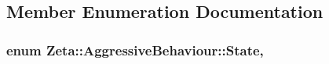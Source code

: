 \subsection{Member Enumeration Documentation}
\hypertarget{classZeta_1_1AggressiveBehaviour_a768e2c9d0969879f4980d72220e11fbe}{
\subsubsection[{State}]{\setlength{\rightskip}{0pt plus 5cm}enum {\bf Zeta\+::\+Aggressive\+Behaviour\+::\+State}\hspace{0.3cm}{\ttfamily [strong]}, {\ttfamily [private]}}}\label{classZeta_1_1AggressiveBehaviour_a768e2c9d0969879f4980d72220e11fbe}
